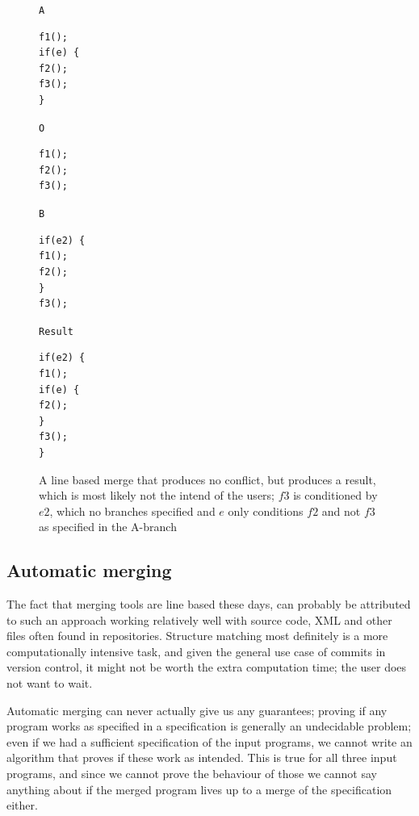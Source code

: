 \documentclass[11pt]{article}
\begin{document}
\begin{figure}

\begin{multicols*}{4}

\texttt{A}


\begin{lstlisting}[language=CSharp]
f1();
if(e) {
f2();
f3();
}
\end{lstlisting}

\columnbreak

\texttt{O}

\begin{lstlisting}[language=CSharp]
f1();
f2();
f3();
\end{lstlisting}

\columnbreak

\texttt{B}
 
\begin{lstlisting}[language=CSharp]
if(e2) {
f1();
f2();
}
f3();
\end{lstlisting}

\columnbreak

\texttt{Result}
 
\begin{lstlisting}[language=CSharp]
if(e2) {
f1();
if(e) {
f2();
}
f3();
}

\end{lstlisting}
\end{multicols*}
\caption{A line based merge that produces no conflict, but produces a result, which is most likely not the intend of the users; $f3$ is conditioned by $e2$, which no branches specified and $e$ only conditions $f2$ and not $f3$ as specified in the A-branch}
\label{WrongMergeFromLineBasedApproach}

\end{figure}

\subsection{Automatic merging}
The fact that merging tools are line based these days, can probably be attributed to such an approach working relatively well with source code, XML and other files often found in repositories. Structure matching most definitely is a more computationally intensive task, and given the general use case of commits in version control, it might not be worth the extra computation time; the user does not want to wait.

Automatic merging can never actually give us any guarantees; proving if any program works as specified in a specification is generally an undecidable problem; even if we had a sufficient specification of the input programs, we cannot write an algorithm that proves if these work as intended. This is true for all three input programs, and since we cannot prove the behaviour of those we cannot say anything about if the merged program lives up to a merge of the specification either.
\end{document}
